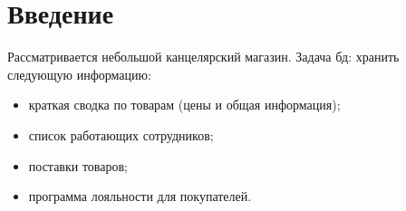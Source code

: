 \section{Введение}

Рассматривается небольшой канцелярский магазин. Задача бд: хранить следующую информацию:
\begin{itemize}
    \item краткая сводка по товарам (цены и общая информация);
    \item список работающих сотрудников;
    \item поставки товаров;
    \item программа лояльности для покупателей.
\end{itemize}